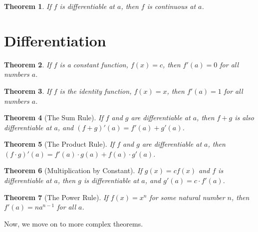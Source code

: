 \documentclass{article}
\numberwithin{corollary}{subsection}
\numberwithin{definition}{subsection}
\numberwithin{lemma}{subsection}
\newtheorem{theorem}{Theorem}
\numberwithin{theorem}{subsection}
\begin{document}
\begin{theorem}
  If $f$ is differentiable at $a$, then $f$ is continuous at $a$.
\end{theorem}

\section{Differentiation}

\begin{theorem}
  If $f$ is a constant function, $f(x) = c$, then $f'(a) = 0$ for all numbers
  $a$.
\end{theorem}

\begin{theorem}
  If $f$ is the identity function, $f(x) = x$, then $f'(a) = 1$ for all numbers
  $a$.
\end{theorem}

\begin{theorem}[The Sum Rule]
  If $f$ and $g$ are differentiable at $a$, then $f + g$ is also differentiable
  at $a$, and $(f + g)'(a) = f'(a) + g'(a)$.
\end{theorem}

\begin{theorem}[The Product Rule]
  If $f$ and $g$ are differentiable at $a$, then $(f \cdot g)'(a) = f'(a) \cdot
  g(a) + f(a) \cdot g'(a)$.
\end{theorem}

\begin{theorem}[Multiplication by Constant]
  If $g(x) = cf(x)$ and $f$ is differentiable at $a$, then $g$ is
  differentiable at $a$, and $g'(a) = c \cdot f'(a)$.
\end{theorem}

\begin{theorem}[The Power Rule]
  If $f(x) = x^n$ for some natural number $n$, then $f'(a) = na^{n-1}$ for all
  $a$.
\end{theorem}

Now, we move on to more complex theorems.
\end{document}
